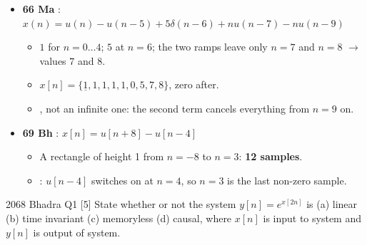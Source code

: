 {\begin{itemize}
  \item \textbf{66 Ma} : $x(n)=u(n)-u(n-5)+5\delta(n-6)+nu(n-7)-nu(n-9)$
  \begin{itemize}
    \item $1$ for $n=0\ldots4$; $5$ at $n=6$; the two ramps leave only
          $n=7$ and $n=8$ $\rightarrow$ values $7$ and $8$.
    \item $x[n]=\{\underline{1},1,1,1,1,0,5,7,8\}$, zero after.
    \item {}, not an infinite one: the second term
          cancels everything from $n=9$ on.
  \end{itemize}
  \item \textbf{69 Bh} : $x[n]=u[n+8]-u[n-4]$
  \begin{itemize}
    \item A rectangle of height 1 from $n=-8$ to $n=3$: \textbf{12 samples}.
    \item {}: $u[n-4]$ switches on at $n=4$, so $n=3$ is
          the last non-zero sample.
  \end{itemize}
\end{itemize}}

\hr

{\color{sub}\footnotesize {} }

\begin{asked}{2068 Bhadra \textperiodcentered{} Q1 \textperiodcentered{} [5]}
State whether or not the system $y[n]=e^{x[2n]}$ is (a) linear (b) time invariant
(c) memoryless (d) causal, where $x[n]$ is input to system and $y[n]$ is output of system.
\end{asked}

